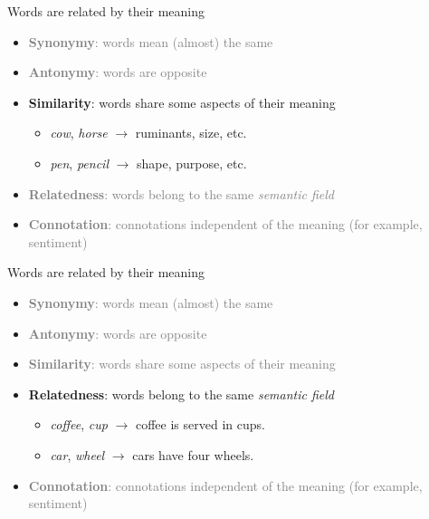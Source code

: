 \documentclass{beamer}
\begin{document}
\begin{frame}{Words are related by their meaning}
  \begin{itemize}
      \item \textcolor{gray}{\textbf{Synonymy}: words mean (almost) the same}
      \item \textcolor{gray}{\textbf{Antonymy}: words are opposite}
      \item \textbf{Similarity}: words share some aspects of their meaning
      \begin{itemize}
          \item \textit{cow}, \textit{horse} $\rightarrow$ ruminants, size, etc.
          \item \textit{pen}, \textit{pencil} $\rightarrow$ shape, purpose, etc.
      \end{itemize}
      \item \textcolor{gray}{\textbf{Relatedness}: words belong to the same \textit{semantic field}}
      \item \textcolor{gray}{\textbf{Connotation}: connotations independent of the meaning (for example, sentiment)}
  \end{itemize}
\end{frame}

\begin{frame}{Words are related by their meaning}
  \begin{itemize}
      \item \textcolor{gray}{\textbf{Synonymy}: words mean (almost) the same }
      \item \textcolor{gray}{\textbf{Antonymy}: words are opposite}
      \item \textcolor{gray}{\textbf{Similarity}: words share some aspects of their meaning}
      \item \textbf{Relatedness}: words belong to the same \textit{semantic field}
      \begin{itemize}
          \item \textit{coffee}, \textit{cup} $\rightarrow$ coffee is served in cups.
          \item \textit{car}, \textit{wheel} $\rightarrow$ cars have four wheels.
      \end{itemize}
      \item \textcolor{gray}{\textbf{Connotation}: connotations independent of the meaning (for example, sentiment)}
  \end{itemize}
\end{frame}
\end{document}
